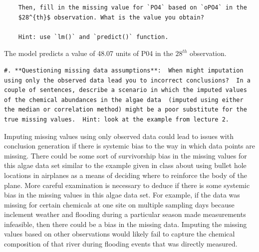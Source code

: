 \documentclass[]{article}
\newenvironment{Shaded}{\begin{snugshade}}{\end{snugshade}}
\newcommand{\KeywordTok}[1]{\textcolor[rgb]{0.13,0.29,0.53}{\textbf{#1}}}
\newcommand{\DataTypeTok}[1]{\textcolor[rgb]{0.13,0.29,0.53}{#1}}
\newcommand{\DecValTok}[1]{\textcolor[rgb]{0.00,0.00,0.81}{#1}}
\newcommand{\StringTok}[1]{\textcolor[rgb]{0.31,0.60,0.02}{#1}}
\newcommand{\OperatorTok}[1]{\textcolor[rgb]{0.81,0.36,0.00}{\textbf{#1}}}
\newcommand{\NormalTok}[1]{#1}
\begin{document}
\begin{verbatim}
    Then, fill in the missing value for `PO4` based on `oPO4` in the
    $28^{th}$ observation. What is the value you obtain? 
    
    Hint: use `lm()` and `predict()` function.
\end{verbatim}

\begin{Shaded}
\end{Shaded}

The model predicts a value of 48.07 units of P04 in the \(28^{th}\)
observation.

\begin{verbatim}
#. **Questioning missing data assumptions**:  When might imputation using only the observed data lead you to incorrect conclusions?  In a couple of sentences, describe a scenario in which the imputed values of the chemical abundances in the algae data  (imputed using either the median or correlation method) might be a poor substitute for the true missing values.  Hint: look at the example from lecture 2.  
\end{verbatim}

Imputing missing values using only observed data could lead to issues
with conclusion generation if there is systemic bias to the way in which
data points are missing. There could be some sort of survivorship bias
in the missing values for this algae data set similar to the example
given in class about using bullet hole locations in airplanes as a means
of deciding where to reinforce the body of the plane. More careful
examination is necessary to deduce if there is some systemic bias in the
missing values in this algae data set. For example, if the data was
missing for certain chemicals at one site on multiple sampling days
because inclement weather and flooding during a particular season made
measurements infeasible, then there could be a bias in the missing data.
Imputing the missing values based on other observations would likely
fail to capture the chemical composition of that river during flooding
events that was directly measured.
\end{document}
